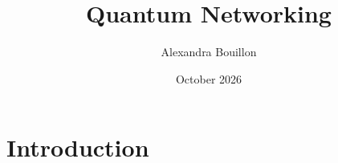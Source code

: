 \documentclass{article}
\title{Quantum Networking}
\author{Alexandra Bouillon}
\date{October 2026}
\begin{document}
\maketitle

\section{Introduction}
\end{document}
